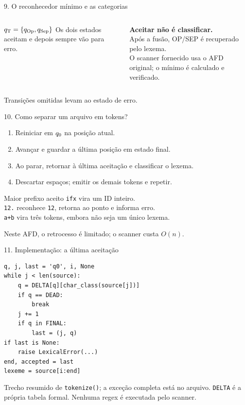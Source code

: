 \documentclass[aspectratio=169,11pt]{beamer}
\begin{document}
\begin{frame}{9. O reconhecedor mínimo e as categorias}
\begin{columns}
\resizebox{.97\linewidth}{!}{}
\small
\begin{block}{$q_{\mathrm{T}}=\{q_{\mathrm{Op}},q_{\mathrm{Sep}}\}$}
Os dois estados aceitam e depois sempre vão para erro.
\end{block}
\textbf{Aceitar não é classificar.}\\[2mm]
Após a fusão, OP/SEP é recuperado pelo lexema.\\[2mm]
O scanner fornecido usa o AFD original; o mínimo é calculado e verificado.
\end{columns}
\vspace{1mm}\scriptsize Transições omitidas levam ao estado de erro.
\end{frame}

\begin{frame}{10. Como separar um arquivo em tokens?}
\begin{enumerate}
\item Reiniciar em $q_{\mathrm{0}}$ na posição atual.
\item Avançar e guardar a última posição em estado final.
\item Ao parar, retornar à última aceitação e classificar o lexema.
\item Descartar espaços; emitir os demais tokens e repetir.
\end{enumerate}
\begin{exampleblock}{Maior prefixo aceito}
\texttt{ifx} vira um ID inteiro.\\
\texttt{12.} reconhece \texttt{12}, retorna ao ponto e informa erro.\\
\texttt{a+b} vira três tokens, embora não seja um único lexema.
\end{exampleblock}
Neste AFD, o retrocesso é limitado; o scanner custa $O(n)$.
\end{frame}

\begin{frame}[fragile]{11. Implementação: a última aceitação}
\begin{lstlisting}
q, j, last = 'q0', i, None
while j < len(source):
    q = DELTA[q][char_class(source[j])]
    if q == DEAD:
        break
    j += 1
    if q in FINAL:
        last = (j, q)
if last is None:
    raise LexicalError(...)
end, accepted = last
lexeme = source[i:end]
\end{lstlisting}
\small Trecho resumido de \texttt{tokenize()}; a exceção completa está no arquivo.
\texttt{DELTA} é a própria tabela formal. Nenhuma regex é executada pelo scanner.
\end{frame}
\end{document}
